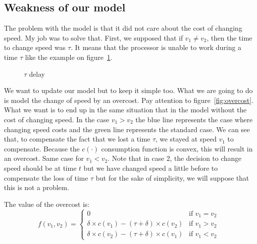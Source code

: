 \documentclass[
10pt, %
a4paper, %
oneside, %
headinclude,footinclude, %
BCOR5mm, %
]{scrartcl}
\begin{document}
\subsection{Weakness of our model}
The problem with the model is that it did not care about the cost of
changing speed. My job was to solve that. First, we supposed that if
$v_1\neq v_2$, then the time to change speed was $\tau$. It means that
the processor is unable to work during a time $\tau$ like the example
on figure~\ref{fig:delay}.
\begin{figure}
  \centering
  \caption{$\tau$ delay}
  \label{fig:delay}
\end{figure}

We want to update our model but to keep it simple too. What we are
going to do is model the change of speed by an overcost. Pay attention
to figure~\ref{fig:overcost}. What we want is to end up in the same
situation that in the model without the cost of changing speed. In the
case $v_1>v_2$ the blue line represents the case where changing speed
costs and the green line represents the standard case. We can see
that, to compensate the fact that we lost a time $\tau$, we stayed at
speed $v_1$ to compensate. Because the $c(\cdot)$ consumption function
is convex, this will result in an overcost. Same case for
$v_1<v_2$. Note that in case 2, the decision to change speed should be
at time $t$ but we have changed speed a little before to compensate
the loss of time $\tau$ but for the sake of simplicity, we will
suppose that this is not a problem.

The value of the overcost is:
\begin{equation}
  \label{eq:overcost}
  f(v_1,v_2)=
  \begin{cases}
    0 & \mbox{if } v_1=v_2 \\
    \delta\times c(v_1) - (\tau + \delta)\times c(v_2) & \mbox{if }
    v_1>v_2 \\
    \delta\times c(v_2) - (\tau + \delta)\times c(v_1) & \mbox{if }
    v_1<v_2
  \end{cases}
\end{equation}
\end{document}
